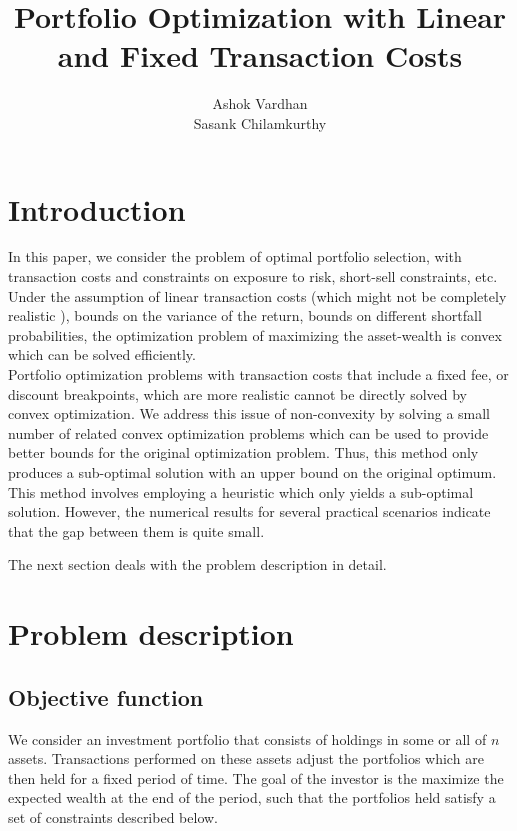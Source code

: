 \documentclass[a4paper]{article}
\title{Portfolio Optimization with Linear and Fixed Transaction Costs}
\author{Ashok Vardhan \\ Sasank Chilamkurthy}
\begin{document}
\maketitle


\section{Introduction}

In this paper, we consider the problem of optimal portfolio selection, with transaction costs and constraints on exposure to risk, short-sell constraints, etc. Under the assumption of linear transaction costs (which might not be completely realistic ), bounds on the variance of the return, bounds on  different shortfall probabilities, the optimization problem of maximizing the asset-wealth is convex which can be solved efficiently.\\[0.2em]

Portfolio optimization problems with transaction costs that include a fixed fee, or discount
breakpoints, which are more realistic cannot be directly solved by convex optimization. We address this issue of non-convexity by solving a small number of related convex optimization problems which can be used to provide better bounds for the original optimization problem. Thus, this method only produces a sub-optimal solution with an upper bound on the original optimum. This method involves employing a heuristic which only yields a sub-optimal solution. However, the numerical results for several practical scenarios indicate that the gap between them is quite small.

The next section deals with the problem description in detail.

\section{Problem description}

\subsection{Objective function}

We consider an investment portfolio that consists of holdings in some or all of $n$ assets. Transactions performed on these assets adjust the portfolios which are then held for a fixed period of time. The goal of the investor is the maximize the expected wealth at the end of the period, such that the portfolios held satisfy  a set of constraints described below.\\[0.2em]
\end{document}
